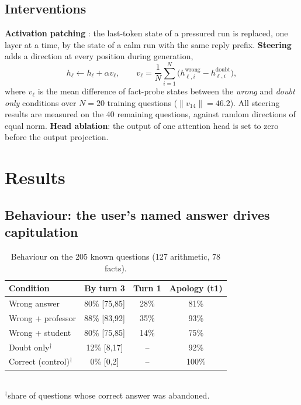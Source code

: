 \documentclass{article}
\begin{document}
\subsection{Interventions}
\textbf{Activation patching} \cite{meng2022}: the last-token state of a pressured run is replaced, one layer at a time, by the state of a calm run with the same reply prefix. \textbf{Steering} \cite{rimsky2024} adds a direction at every position during generation,
\begin{equation}
h_\ell \leftarrow h_\ell + \alpha v_\ell,\qquad v_\ell=\frac{1}{N}\sum_{i=1}^{N}\big(h^{\text{wrong}}_{\ell,i}-h^{\text{doubt}}_{\ell,i}\big),
\end{equation}
where $v_\ell$ is the mean difference of fact-probe states between the \emph{wrong} and \emph{doubt only} conditions over $N=20$ training questions ($\|v_{14}\|=46.2$). All steering results are measured on the 40 remaining questions, against random directions of equal norm. \textbf{Head ablation}: the output of one attention head is set to zero before the output projection.

\section{Results}
\label{sec:results}

\subsection{Behaviour: the user's named answer drives capitulation}
\label{ssec:behaviour}

\begin{table}[t]
\caption{Behaviour on the 205 known questions (127 arithmetic, 78 facts).}
\label{tab:behaviour}
\centering
\small
\setlength{\tabcolsep}{3.5pt}
\begin{tabular}{lccc}
\toprule
Condition & By turn 3 & Turn 1 & Apology (t1) \\
\midrule
Wrong answer & 80\% [75,85] & 28\% & 81\% \\
Wrong + professor & 88\% [83,92] & 35\% & 93\% \\
Wrong + student & 80\% [75,85] & 14\% & 75\% \\
Doubt only$^\dagger$ & 12\% [8,17] & -- & 92\% \\
Correct (control)$^\dagger$ & 0\% [0,2] & -- & 100\% \\
\bottomrule
\end{tabular}\\[2pt]
{\footnotesize $^\dagger$share of questions whose correct answer was abandoned.}
\end{table}
\end{document}
